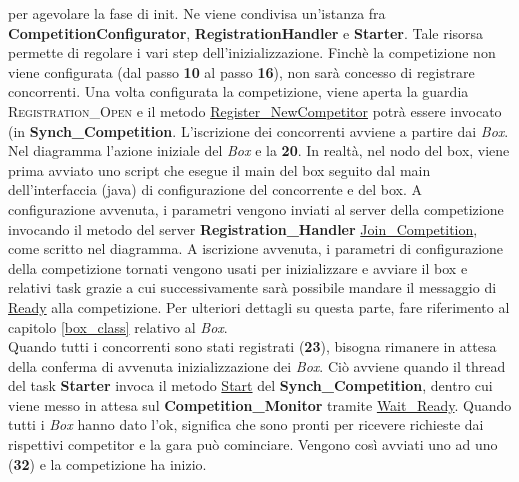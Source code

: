 per agevolare la fase di init. Ne viene condivisa un'istanza fra \textbf{CompetitionConfigurator}, \textbf{RegistrationHandler} e \textbf{Starter}.
Tale risorsa permette di regolare i vari step dell'inizializzazione. Finch\`{e} la competizione non viene configurata (dal passo \textbf{10} al passo \textbf{16}),
non sar\`{a} concesso di registrare concorrenti. Una volta configurata la competizione, viene aperta la guardia \textsc{Registration\_Open} e il metodo
\underline{Register\_NewCompetitor} potr\`{a} essere invocato (in \textbf{Synch\_Competition}. L'iscrizione dei concorrenti avviene a partire dai \emph{Box}.
Nel diagramma l'azione iniziale del \emph{Box} e la \textbf{20}. In realt\`{a}, nel nodo del box, viene prima avviato uno script che esegue il main del box
seguito dal main dell'interfaccia (java) di configurazione del concorrente e del box. A configurazione avvenuta, i parametri vengono inviati al server della
competizione invocando il metodo del server \textbf{Registration\_Handler} \underline{Join\_Competition}, come scritto nel diagramma. A iscrizione avvenuta, 
i parametri di configurazione della competizione tornati vengono usati per inizializzare e avviare il box e relativi task grazie a cui successivamente
sar\`{a} possibile mandare il messaggio di \underline{Ready} alla competizione. Per ulteriori dettagli su questa parte, fare riferimento al capitolo
\ref{box_class} relativo al \emph{Box}.\\
Quando tutti i concorrenti sono stati registrati (\textbf{23}), bisogna rimanere in attesa della conferma di avvenuta inizializzazione dei \emph{Box}. Ci\`{o}
avviene quando il thread del task \textbf{Starter} invoca il metodo \underline{Start} del \textbf{Synch\_Competition}, dentro cui viene messo in attesa
sul \textbf{Competition\_Monitor} tramite \underline{Wait\_Ready}. Quando tutti i \emph{Box} hanno dato l'ok, significa che sono pronti per ricevere
richieste dai rispettivi competitor e la gara pu\`{o} cominciare. Vengono cos\`{i} avviati uno ad uno (\textbf{32}) e la competizione ha inizio.
